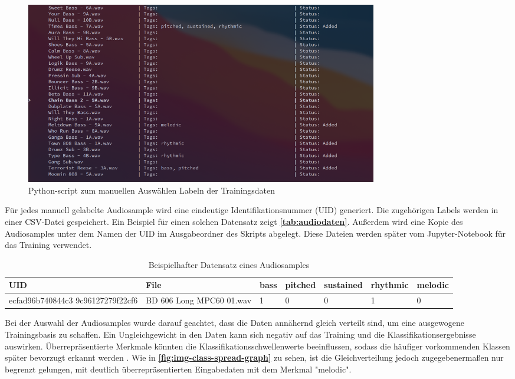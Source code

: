 \begin{figure}[h!]
	\centering
	\includegraphics[width=0.75\textwidth]{images/08_durchfuehrung/nn/training_script_screenshot.png}
	\caption{Python-script zum manuellen Auswählen Labeln der Trainingsdaten}
	\label{fig:training_script_screenshot}
\end{figure}

Für jedes manuell gelabelte Audiosample wird eine eindeutige Identifikationsnummer (UID) generiert. Die zugehörigen Labels werden in einer CSV-Datei gespeichert. Ein Beispiel für einen solchen Datensatz zeigt \textbf{\autoref{tab:audiodaten}}. Außerdem wird eine Kopie des Audiosamples unter dem Namen der UID im Ausgabeordner des Skripts abgelegt. Diese Dateien werden später vom Jupyter-Notebook für das Training verwendet.

\begin{table}[h!]
\centering
\begin{tabular}{|m{2.8cm}|m{4.5cm}|m{0.8cm}|m{1.2cm}|m{1.5cm}|m{1.5cm}|m{1.3cm}|}
\hline
\textbf{UID} & \textbf{File} & \textbf{bass} & \textbf{pitched} & \textbf{sustained} & \textbf{rhythmic} & \textbf{melodic} \\ \hline
ecfad96b740844c3
9c96127279f22cf6 &  BD 606 Long MPC60 01.wav & 1 & 0 & 0 & 1 & 0 \\ \hline
\end{tabular}
\caption{Beispielhafter Datensatz eines Audiosamples}
\label{tab:audiodaten}
\end{table}

Bei der Auswahl der Audiosamples wurde darauf geachtet, dass die Daten annähernd gleich verteilt sind, um eine ausgewogene Trainingsbasis zu schaffen. Ein Ungleichgewicht in den Daten kann sich negativ auf das Training und die Klassifikationsergebnisse auswirken. Überrepräsentierte Merkmale könnten die Klassifikationsschwellenwerte beeinflussen, sodass die häufiger vorkommenden Klassen später bevorzugt erkannt werden \cite{nn-imbalance-input-data}. Wie in \textbf{\autoref{fig:img-class-spread-graph}} zu sehen, ist die Gleichverteilung jedoch zugegebenermaßen nur begrenzt gelungen, mit deutlich überrepräsentierten Eingabedaten mit dem Merkmal "melodic".

